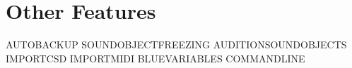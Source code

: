 \section{Other Features}\label{otherFeatures}

AUTOBACKUP SOUNDOBJECTFREEZING AUDITIONSOUNDOBJECTS IMPORTCSD IMPORTMIDI
BLUEVARIABLES COMMANDLINE
